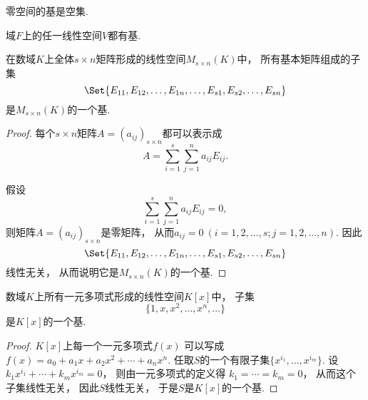 \begin{property}\label{theorem:线性空间的结构.零空间的基是空集}
零空间的基是空集.
\end{property}

\begin{property}
域\(F\)上的任一线性空间\(V\)都有基.
\end{property}

\begin{example}
在数域\(K\)上全体\(s \times n\)矩阵形成的线性空间\(M_{s \times n}(K)\)中，
所有基本矩阵组成的子集\begin{equation*}
	\Set{
		E_{11},E_{12},\dotsc,E_{1n},
		\dotsc,
		E_{s1},E_{s2},\dotsc,E_{sn}
	}
\end{equation*}是\(M_{s \times n}(K)\)的一个基.
\begin{proof}
每个\(s \times n\)矩阵\(A = (a_{ij})_{s \times n}\)都可以表示成\begin{equation*}
	A = \sum_{i=1}^s \sum_{j=1}^n a_{ij} E_{ij}.
\end{equation*}

假设\begin{equation*}
	\sum_{i=1}^s \sum_{j=1}^n a_{ij} E_{ij} = 0,
\end{equation*}
则矩阵\(A = (a_{ij})_{s \times n}\)是零矩阵，
从而\(a_{ij} = 0\ (i=1,2,\dotsc,s;j=1,2,\dotsc,n)\).
因此\begin{equation*}
	\Set{
		E_{11},E_{12},\dotsc,E_{1n},
		\dotsc,
		E_{s1},E_{s2},\dotsc,E_{sn}
	}
\end{equation*}线性无关，
从而说明它是\(M_{s \times n}(K)\)的一个基.
\end{proof}
\end{example}

\begin{example}
数域\(K\)上所有一元多项式形成的线性空间\(K[x]\)中，
子集\begin{equation*}
	\{1,x,x^2,\dotsc,x^n,\dotsc\}
\end{equation*}是\(K[x]\)的一个基.
\begin{proof}
\(K[x]\)上每一个一元多项式\(f(x)\)
可以写成\(f(x)=a_0+a_1 x+a_2 x^2+\dotsb+a_n x^n\).
任取\(S\)的一个有限子集\(\{x^{i_1},\dotsc,x^{i_m}\}\).
设\(k_1 x^{i_1}+\dotsb+k_m x^{i_m}=0\)，
则由一元多项式的定义得
\(k_1=\dotsb=k_m=0\)，
从而这个子集线性无关，
因此\(S\)线性无关，
于是\(S\)是\(K[x]\)的一个基.
\end{proof}
\end{example}

